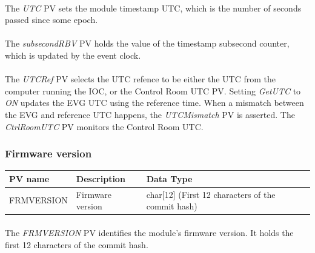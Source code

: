 \documentclass[openany]{article}
\begin{document}
			\paragraph{} The \emph{UTC} PV sets the module timestamp UTC, which is the number of seconds passed since some epoch.
			\paragraph{} The \emph{subsecondRBV} PV holds the value of the timestamp subsecond counter, which is updated by the event clock.
			\paragraph{} The \emph{UTCRef} PV selects the UTC refence to be either the UTC from the computer running the IOC, or the Control Room UTC PV. Setting \emph{GetUTC} to \emph{ON} updates the EVG UTC using the reference time. When a mismatch between the EVG and reference UTC happens, the \emph{UTCMismatch} PV is asserted. The \emph{CtrlRoomUTC} PV monitors the Control Room UTC.

			\bigskip
			\setlength{\fboxsep}{8pt}

		\subsubsection{Firmware version}\label{pvgroup:evg-firmware-version}
			\begin{center}
			\begin{tabular}{| m{2.8cm} m{6cm} m{6cm} |}
			    \hline
			    \bfseries PV name & \bfseries Description & \bfseries Data Type \\ \hline
			    FRMVERSION & Firmware version & char[12] (First 12 characters of the commit hash) \\ \hline
			\end{tabular}
			\end{center}

			\paragraph{} The \emph{FRMVERSION} PV identifies the module's firmware version. It holds the first 12 characters of the commit hash.
\end{document}
